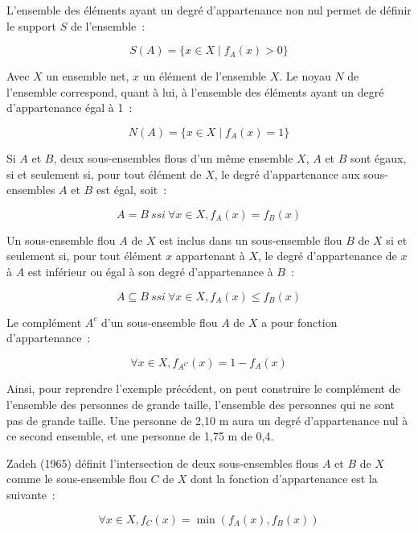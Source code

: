 L’ensemble des éléments ayant un degré d’appartenance non nul permet
de définir le support $S$ de l’ensemble :

\begin{equation}
  S(A) = \{x ∈ X \mid f_A(x) > 0\}
\end{equation}

Avec $X$ un ensemble net, $x$ un élément de l’ensemble $X$. Le noyau
$N$ de l’ensemble correspond, quant à lui, à l’ensemble des éléments
ayant un degré d’appartenance égal à 1 :

\begin{equation}
  N(A) = \{x ∈ X \mid f_A(x) = 1\}
\end{equation}

Si $A$ et $B$, deux sous-ensembles flous d’un même ensemble $X$, $A$
et $B$ sont égaux, si et seulement si, pour tout élément de $X$, le
degré d’appartenance aux sous-ensembles $A$ et $B$ est égal, soit :

\begin{equation}
  A = B\ ssi\ ∀x ∈ X, f_A(x) = f_B(x)
\end{equation}

Un sous-ensemble flou $A$ de $X$ est inclus dans un sous-ensemble flou
$B$ de $X$ si et seulement si, pour tout élément $x$ appartenant à
$X$, le degré d’appartenance de $x$ à $A$ est inférieur ou égal à son
degré d’appartenance à $B$ :

\begin{equation}
  A ⊆ B\ ssi\ ∀x ∈ X, f_A(x) ≤ f_B(x)
\end{equation}

Le complément $A^c$ d’un sous-ensemble flou $A$ de $X$ a pour fonction
d’appartenance :

\begin{equation}
  ∀x ∈ X, f_{A^C}(x) = 1 − f_A(x)
\end{equation}

Ainsi, pour reprendre l’exemple précédent, on peut construire le
complément de l’ensemble des personnes de grande taille, l’ensemble
des personnes qui ne sont pas de grande taille. Une personne de 2,10 m
aura un degré d’appartenance nul à ce second ensemble, et une personne
de 1,75 m de 0,4.

Zadeh (1965) définit l’intersection de deux sous-ensembles flous $A$
et $B$ de $X$ comme le sous-ensemble flou $C$ de $X$ dont la fonction
d’appartenance est la suivante :

\begin{equation}
  \label{eq:norm_zadeh}
  ∀x ∈ X, f_C (x) = \min(f_A(x), f_B(x))
\end{equation}

